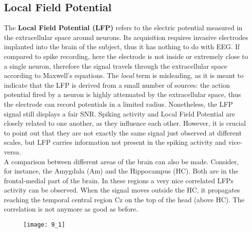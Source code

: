 \subsection{Local Field Potential}
The \textbf{Local Field Potential (LFP)} refers to the electric potential measured in the
extracellular space around neurons. Its acquisition requires invasive electrodes
implanted into the brain of the subject, thus it has nothing to do with EEG. If compared to
spike recording, here the electrode is not inside or extremely close to a single neuron,
therefore the signal travels through the extracellular space according to Maxwell's
equations. The \textit{local} term is misleading, as it is meant to indicate that
the LFP is derived from a small number of sources: the action potential fired by a
neuron is highly attenuated by the extracellular space, thus the electrode can record
potentials in a limited radius. Nonetheless, the LFP signal still displays a fair
SNR. Spiking activity and Local Field Potential are closely
related to one another, as they influence each other. However, it is crucial to point
out that they are not exactly the same signal just observed at different scales, but
LFP carries information not present in the spiking activity and vice-versa.\\
A comparison between different areas of the brain can also be made. Consider, for instance,
the Amygdala (Am) and the Hippocampus (HC). Both are in the frontal-medial part of the brain.
In these regions a very nice correlated LFPs activity can be observed. When
the signal moves outside the HC, it propagates reaching the temporal central region
Cz on the top of the head (above HC). The correlation is not anymore as good as before.
\begin{figure}[H]
    \texttt{[image: 9\_1]}
    \centering
\end{figure}
